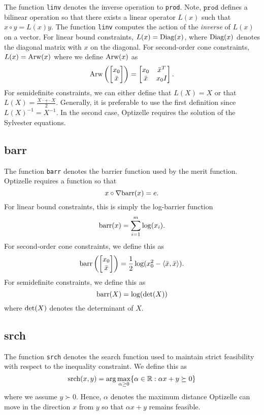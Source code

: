 \documentclass{report}
\newcommand{\re}{\mathbb{R}}
\begin{document}
        The function \texttt{linv} denotes the inverse operation to \texttt{prod}.  Note, $\texttt{prod}$ defines a bilinear operation so that there exists a linear operator $L(x)$ such that $x\circ y=L(x)y$.  The function \texttt{linv} computes the action of the {\it inverse} of $L(x)$ on a vector.  For linear bound constraints, $L(x)=\textnormal{Diag}(x)$, where $\textnormal{Diag}(x)$ denotes the diagonal matrix with $x$ on the diagonal.  For second-order cone constraints, $L(x)=\textnormal{Arw}(x)$ where we define $\textnormal{Arw}(x)$ as
$$
        \textnormal{Arw}\left(\begin{bmatrix}x_0\\\bar{x}\end{bmatrix}\right) =
\begin{bmatrix}
        x_0 & \bar{x}^T\\\bar{x} & x_0 I
\end{bmatrix}.
$$
For semidefinite constraints, we can either define that $L(X)=X$ or that $L(X)=\frac{X\cdot + \cdot X}{2}$.  Generally, it is preferable to use the first definition since $L(X)^{-1}=X^{-1}$.  In the second case, Optizelle requires the solution of the Sylvester equations.

\subsection{barr}

        The function \texttt{barr} denotes the barrier function used by the merit function.  Optizelle requires a function so that
$$
    x\circ \nabla \textnormal{barr}(x) = e.
$$
For linear bound constraints, this is simply the log-barrier function
$$
    \textnormal{barr}(x) = \sum\limits_{i=1}^m \log(x_i).
$$
For second-order cone constraints, we define this as
$$
    \textnormal{barr}\left(\begin{bmatrix}x_0\\\bar{x}\end{bmatrix}\right) = \frac{1}{2} \log(x_0^2-\langle \bar{x},\bar{x}\rangle).
$$
For semidefinite constraints, we define this as
$$
    \textnormal{barr}(X)=\log(\textnormal{det}(X))
$$
where $\textnormal{det}(X)$ denotes the determinant of $X$.

\subsection{srch}

        The function \texttt{srch} denotes the search function used to maintain strict feasibility with respect to the inequality constraint.  We define this as
$$
    \textnormal{srch}(x,y)=\arg\max\limits_{\alpha\geq 0} \{ \alpha\in\re : \alpha x + y \succeq 0\}
$$
where we assume $y\succ 0$.  Hence, $\alpha$ denotes the maximum distance Optizelle can move in the direction $x$ from $y$ so that $\alpha x + y$ remains feasible.
\end{document}
